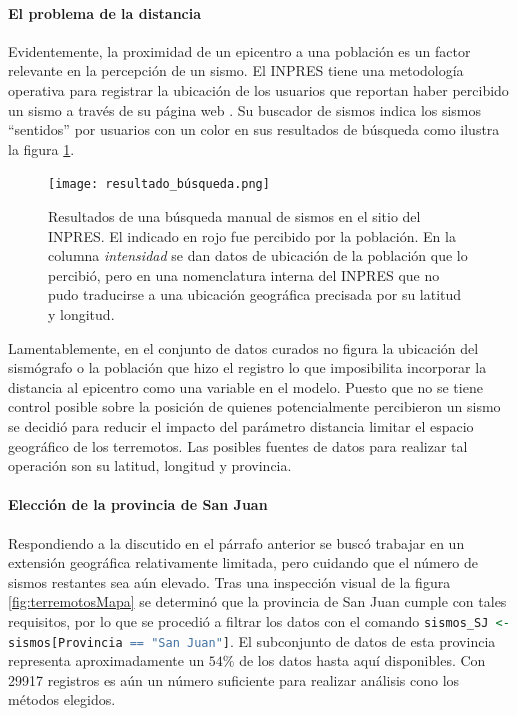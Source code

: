 \documentclass[a4paper]{report}
\begin{document}


\paragraph{El problema de la distancia}
Evidentemente, la proximidad de un epicentro a una población es un factor relevante en la percepción de un sismo.
El INPRES tiene una metodología operativa para registrar la ubicación de los usuarios que reportan haber percibido un sismo a través de su página web \cite{noauthor_acerca_nodate}.
Su buscador de sismos indica los sismos ``sentidos'' por usuarios con un color en sus resultados de búsqueda como ilustra la figura \ref{fig:resultado_búsqueda}.

\begin{figure}[!ht]
\centering
\texttt{[image: resultado\_búsqueda.png]}
\caption{Resultados de una búsqueda manual de sismos en el sitio del INPRES. El indicado en rojo fue percibido por la población. En la columna \emph{intensidad} se dan datos de ubicación de la población que lo percibió, pero en una nomenclatura interna del INPRES que no pudo traducirse a una ubicación geográfica precisada por su latitud y longitud.}
\label{fig:resultado_búsqueda}
\end{figure}

Lamentablemente, en el conjunto de datos curados no figura la ubicación del sismógrafo o la población que hizo el registro lo que imposibilita incorporar la distancia al epicentro como una variable en el modelo.%
Puesto que no se tiene control posible sobre la posición de quienes potencialmente percibieron un sismo se decidió para reducir el impacto del parámetro distancia limitar el espacio geográfico de los terremotos.
Las posibles fuentes de datos para realizar tal operación son su latitud, longitud y provincia.


\paragraph{Elección de la provincia de San Juan}
Respondiendo a la discutido en el párrafo anterior se buscó trabajar en un extensión geográfica relativamente limitada, pero cuidando que el número de sismos restantes sea aún elevado.
Tras una inspección visual de la figura \ref{fig:terremotosMapa} se determinó  que la provincia de San Juan cumple con tales requisitos, por lo que se procedió a filtrar los datos con el comando \lstinline[language=R,breaklines=true,basicstyle=\ttfamily]'sismos_SJ <- sismos[Provincia == "San Juan"]'.
El subconjunto de datos de esta provincia representa aproximadamente un \(54 \%\) de los datos hasta aquí disponibles.
Con \num{29917} registros es aún un número suficiente para realizar análisis cono los métodos elegidos.
\end{document}
